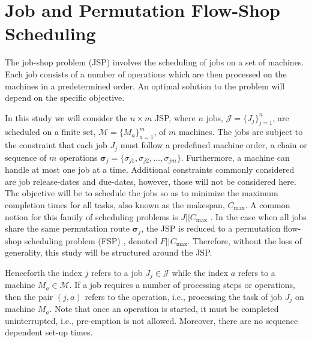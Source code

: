 \documentclass[smallextended]{svjour3}
\renewcommand{\vsigma}{\bm \sigma}
\begin{document}
		
\section{Job and Permutation Flow-Shop Scheduling}\label{sec:problemdef}
The job-shop problem (JSP) involves the scheduling of jobs on a set of 
machines. Each job consists of a number of operations which are then processed 
on the machines in a predetermined order. An optimal solution to the problem 
will depend on the specific objective. 

In this study we will consider the $n\times m$ JSP, where $n$ jobs, 
$\mathcal{J}=\{J_j\}_{j=1}^n$, are scheduled on a finite set, 
$\mathcal{M}=\{M_a\}_{a=1}^m$, of $m$ machines. The jobs are subject to the 
constraint that each job $J_j$ must follow a predefined machine order, a chain 
or sequence of $m$ operations 
$\vsigma_j=\{\sigma_{j1},\sigma_{j2},\dotsc,\sigma_{jm}\}$. 
Furthermore, a machine can handle at most one job at a time. Additional 
constraints commonly considered are job release-dates and due-dates, however, 
those will not be considered here.  The objective will be to schedule the jobs 
so as to minimize the maximum completion times for all tasks, also known as the 
makespan, $C_{\max}$. A common notion for this family of scheduling problems is 
$J||C_{\max}$ \citep{Pinedo08}.  In the case when all jobs share the same 
permutation route $\vsigma_j$, the JSP is reduced to a permutation flow-shop 
scheduling problem (FSP) \citep{Guinet1998,Tay08}, denoted $F||C_{\max}$. 
Therefore, without the loss of generality, this study will be structured around 
the JSP.

Henceforth the index $j$ refers to a job $J_j\in\mathcal{J}$ while the index 
$a$ refers to a machine $M_a\in\mathcal{M}$. If a job requires a number of 
processing steps or operations, then the pair $(j,a)$ refers to the operation, 
i.e., processing the task of job $J_j$ on machine $M_a$. Note that once an 
operation is started, it must be completed uninterrupted, i.e., pre-emption is 
not allowed. Moreover, there are no sequence dependent set-up times.
\end{document}
